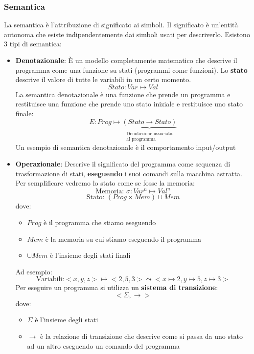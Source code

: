 \documentclass[a4paper]{article}
\begin{document}
\subsubsection{Semantica}
La semantica è l'attribuzione di significato ai simboli.
Il significato è un'entità autonoma che esiste indipendentemente dai simboli
usati per descriverlo. Esistono 3 tipi di semantica:
\begin{itemize}
  \item \textbf{Denotazionale}: È un modello completamente matematico che descrive il
    programma come una funzione su stati (programmi come funzioni). Lo \textbf{stato}
    descrive il valore di tutte le variabili in un certo momento.
    \[
      Stato: Var \mapsto Val
    \] 
    La semantica denotazionale è una funzione che prende un programma e restituisce
    una funzione che prende uno stato iniziale e restituisce uno stato finale:
    \[
      E: Prog \mapsto \underbrace{(Stato \to Stato)}_{\substack{\text{Denotazione associata}\\\text{al programma}}}
    \] 
    Un esempio di semantica denotazionale è il comportamento input/output

  \item \textbf{Operazionale}: Descrive il significato del programma come sequenza
    di trasformazione di stati, \textbf{eseguendo} i suoi comandi sulla macchina astratta.
    Per semplificare vedremo lo stato come se fosse la memoria:
    \[
      \text{Memoria: } \sigma: Var^n \mapsto Val^n
    \] 
    \[
      \text{Stato: } (Prog \times Mem) \cup Mem
    \] 
    dove:
    \begin{itemize}
      \item \( Prog \) è il programma che stiamo eseguendo
      \item \( Mem \) è la memoria su cui stiamo eseguendo il programma
      \item \( \cup Mem \) è l'insieme degli stati finali
    \end{itemize}
    Ad esempio:
    \[
      \text{Variabili:} <x, y, z> \mapsto <2, 5, 3>
      \leadsto <x \mapsto 2, y \mapsto 5, z \mapsto 3>
    \] 
    Per eseguire un programma si utilizza un \textbf{sistema di transizione}:
    \[
      <\Sigma, \to>
    \] 
    dove:
    \begin{itemize}
      \item \( \Sigma \) è l'insieme degli stati
      \item \( \to \) è la relazione di transizione che descrive come si passa da
        uno stato ad un altro eseguendo un comando del programma
    \end{itemize}


\end{itemize}
\end{document}
